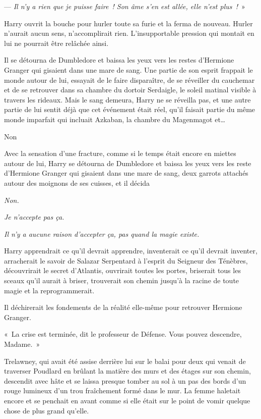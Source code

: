 --- \emph{Il n'y a rien que je puisse faire~! Son âme s'en est allée, elle n'est plus~!}~»

Harry ouvrit la bouche pour hurler toute sa furie et la ferma de nouveau. Hurler n'aurait aucun sens, n'accomplirait rien. L'insupportable pression qui montait en lui ne pourrait être relâchée ainsi.

Il se détourna de Dumbledore et baissa les yeux vers les restes d'Hermione Granger qui gisaient dans une mare de sang. Une partie de son esprit frappait le monde autour de lui, essayait de le faire disparaître, de se réveiller du cauchemar et de se retrouver dans sa chambre du dortoir Serdaigle, le soleil matinal visible à travers les rideaux. Mais le sang demeura, Harry ne se réveilla pas, et une autre partie de lui sentit déjà que cet événement était réel, qu'il faisait partie du même monde imparfait qui incluait Azkaban, la chambre du Magenmagot et…

Non

Avec la sensation d'une fracture, comme si le temps était encore en miettes autour de lui, Harry se détourna de Dumbledore et baissa les yeux vers les reste d'Hermione Granger qui gisaient dans une mare de sang, deux garrots attachés autour des moignons de ses cuisses, et il décida

\emph{Non.}

\emph{Je n'accepte pas ça.}

\emph{Il n'y a aucune raison d'accepter ça, pas quand la magie existe.}

Harry apprendrait ce qu'il devrait apprendre, inventerait ce qu'il devrait inventer, arracherait le savoir de Salazar Serpentard à l'esprit du Seigneur des Ténèbres, découvrirait le secret d'Atlantis, ouvrirait toutes les portes, briserait tous les sceaux qu'il aurait à briser, trouverait son chemin jusqu'à la racine de toute magie et la reprogrammerait.

Il déchirerait les fondements de la réalité elle-même pour retrouver Hermione Granger.

\later

«~La crise est terminée, dit le professeur de Défense. Vous pouvez descendre, Madame.~»

Trelawney, qui avait été assise derrière lui sur le balai pour deux qui venait de traverser Poudlard en brûlant la matière des murs et des étages sur son chemin, descendit avec hâte et se laissa presque tomber au sol à un pas des bords d'un rouge lumineux d'un trou fraîchement formé dans le mur. La femme haletait encore et se penchait en avant comme si elle était sur le point de vomir quelque chose de plus grand qu'elle.

